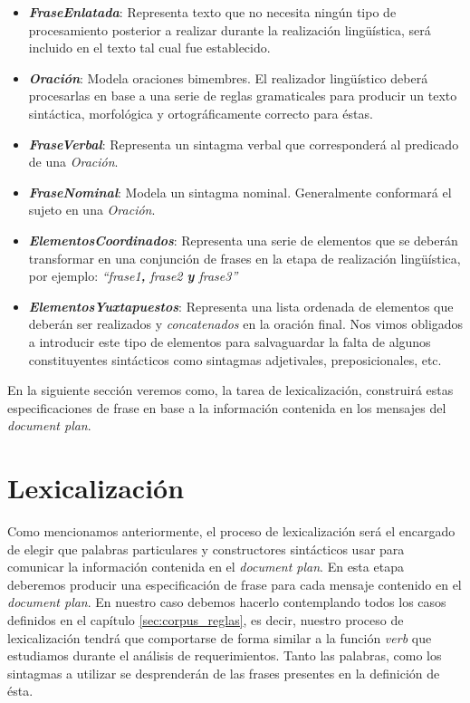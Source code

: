 \medskip
\begin{itemize}
\item{\emph{\textbf{FraseEnlatada}}: Representa texto que no necesita ningún tipo de procesamiento posterior a realizar durante la realización lingüística, será incluido en el texto tal cual fue establecido.}
\item{\emph{\textbf{Oración}}: Modela oraciones bimembres. El realizador lingüístico deberá procesarlas en base a una serie de reglas gramaticales para producir un texto sintáctica, morfológica y ortográficamente correcto para éstas.}
\item{\emph{\textbf{FraseVerbal}}: Representa un sintagma verbal que corresponderá al predicado de una \emph{Oración}.}
\item{\emph{\textbf{FraseNominal}}: Modela un sintagma nominal. Generalmente conformará el sujeto en una \emph{Oración}.}
\item{\emph{\textbf{ElementosCoordinados}}: Representa una serie de elementos que se deberán transformar en una conjunción de frases en la etapa de realización lingüística, por ejemplo: \emph{``frase1\textbf{,} frase2 \textbf{y} frase3''}}
\item{\emph{\textbf{ElementosYuxtapuestos}}: Representa una lista ordenada de elementos que deberán ser realizados y \emph{concatenados} en la oración final. Nos vimos obligados a introducir este tipo de elementos para salvaguardar la falta de algunos constituyentes sintácticos como sintagmas adjetivales, preposicionales, etc.}
\end{itemize}

En la siguiente sección veremos como, la tarea de lexicalización, construirá estas especificaciones de frase en base a la información contenida en los mensajes del \textit{document plan}.

\section{Lexicalización}
\label{sec:microplanning_lexicalization}

Como mencionamos anteriormente, el proceso de lexicalización será el encargado de elegir que palabras particulares y constructores sintácticos usar para comunicar la información contenida en el \textit{document plan}. En esta etapa deberemos producir una especificación de frase para cada mensaje contenido en el \textit{document plan}. En nuestro caso debemos hacerlo contemplando todos los casos definidos en el capítulo \ref{sec:corpus_reglas}, es decir, nuestro proceso de lexicalización tendrá que comportarse de forma similar a la función \emph{verb} que estudiamos durante el análisis de requerimientos. Tanto las palabras, como los sintagmas a utilizar se desprenderán de las frases presentes en la definición de ésta.

